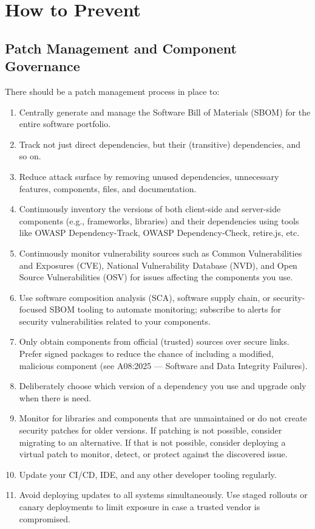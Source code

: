 \documentclass[11pt]{article}
\begin{document}
\section{How to Prevent}

\subsection{Patch Management and Component Governance}
There should be a patch management process in place to:

\begin{enumerate}
  \item Centrally generate and manage the Software Bill of Materials (SBOM) for the entire software portfolio.
  \item Track not just direct dependencies, but their (transitive) dependencies, and so on.
  \item Reduce attack surface by removing unused dependencies, unnecessary features, components, files, and documentation.
  \item Continuously inventory the versions of both client-side and server-side components (e.g., frameworks, libraries) and their dependencies using tools like OWASP Dependency-Track, OWASP Dependency-Check, retire.js, etc.
  \item Continuously monitor vulnerability sources such as Common Vulnerabilities and Exposures (CVE), National Vulnerability Database (NVD), and Open Source Vulnerabilities (OSV) for issues affecting the components you use.
  \item Use software composition analysis (SCA), software supply chain, or security-focused SBOM tooling to automate monitoring; subscribe to alerts for security vulnerabilities related to your components.
  \item Only obtain components from official (trusted) sources over secure links. Prefer signed packages to reduce the chance of including a modified, malicious component (see A08:2025 --- Software and Data Integrity Failures).
  \item Deliberately choose which version of a dependency you use and upgrade only when there is need.
  \item Monitor for libraries and components that are unmaintained or do not create security patches for older versions. If patching is not possible, consider migrating to an alternative. If that is not possible, consider deploying a virtual patch to monitor, detect, or protect against the discovered issue.
  \item Update your CI/CD, IDE, and any other developer tooling regularly.
  \item Avoid deploying updates to all systems simultaneously. Use staged rollouts or canary deployments to limit exposure in case a trusted vendor is compromised.
\end{enumerate}
\end{document}
